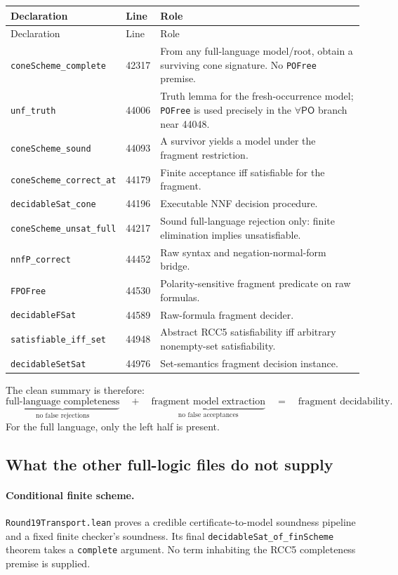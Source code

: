 \documentclass[11pt]{article}
\newcommand{\PO}{\ensuremath{\mathsf{PO}}}
\newcommand{\code}[1]{\texttt{#1}}
\begin{document}
\begin{longtable}{L{0.29\textwidth}L{0.13\textwidth}L{0.49\textwidth}}
\toprule
Declaration & Line & Role \\
\midrule
\endfirsthead
\toprule
Declaration & Line & Role \\
\midrule
\endhead
\code{coneScheme\_complete} & 42317 & From any full-language model/root,
obtain a surviving cone signature.  No \code{POFree} premise. \\
\code{unf\_truth} & 44006 & Truth lemma for the fresh-occurrence model;
\code{POFree} is used precisely in the \(\forall\PO\) branch near 44048. \\
\code{coneScheme\_sound} & 44093 & A survivor yields a model under the
fragment restriction. \\
\code{coneScheme\_correct\_at} & 44179 & Finite acceptance iff satisfiable for
the fragment. \\
\code{decidableSat\_cone} & 44196 & Executable NNF decision procedure. \\
\code{coneScheme\_unsat\_full} & 44217 & Sound full-language rejection only:
finite elimination implies unsatisfiable. \\
\code{nnfP\_correct} & 44452 & Raw syntax and negation-normal-form bridge. \\
\code{FPOFree} & 44530 & Polarity-sensitive fragment predicate on raw formulas. \\
\code{decidableFSat} & 44589 & Raw-formula fragment decider. \\
\code{satisfiable\_iff\_set} & 44948 & Abstract RCC5 satisfiability iff
arbitrary nonempty-set satisfiability. \\
\code{decidableSetSat} & 44976 & Set-semantics fragment decision instance. \\
\bottomrule
\end{longtable}

The clean summary is therefore:
\[
\underbrace{\text{full-language completeness}}_{\text{no false rejections}}
\quad+\quad
\underbrace{\text{fragment model extraction}}_{\text{no false acceptances}}
\quad=\quad
\text{fragment decidability}.
\]
For the full language, only the left half is present.

\subsection{What the other full-logic files do not supply}

\paragraph{Conditional finite scheme.}
\code{Round19Transport.lean} proves a credible certificate-to-model soundness
pipeline and a fixed finite checker's soundness.  Its final
\code{decidableSat\_of\_finScheme} theorem takes a \code{complete} argument.
No term inhabiting the RCC5 completeness premise is supplied.
\end{document}
